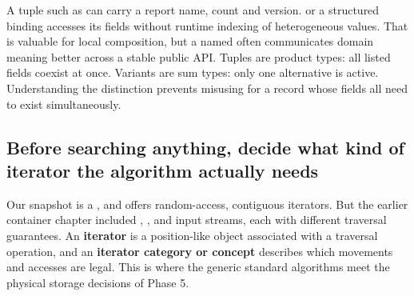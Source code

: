 A tuple such as  can carry a report name, count and version.  or a structured binding accesses its fields without runtime indexing of heterogeneous values. That is valuable for local composition, but a named  often communicates domain meaning better across a stable public API. Tuples are product types: all listed fields coexist at once. Variants are sum types: only one alternative is active. Understanding the distinction prevents misusing  for a record whose fields all need to exist simultaneously.

\subsection{Before searching anything, decide what kind of iterator the algorithm actually needs}\label{05-engine-i-ch006-before-searching-anything-decide-what-kind-of-iterator-the-algorithm-actually-needs}

\hypertarget{05-engine-i-ch006-before-searching-anything-decide-what-kind-of-iterator-the-algorithm-actually-needs}{}

Our snapshot is a , and  offers random-access, contiguous iterators. But the earlier container chapter included , ,  and input streams, each with different traversal guarantees. An \textbf{iterator} is a position-like object associated with a traversal operation, and an \textbf{iterator category or concept} describes which movements and accesses are legal. This is where the generic standard algorithms meet the physical storage decisions of Phase 5.

